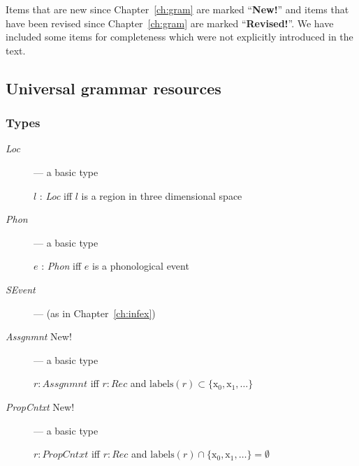 Items that are new since Chapter~\ref{ch:gram} are marked
``\textbf{New!}'' and items that have been revised since
Chapter~\ref{ch:gram} are marked ``\textbf{Revised!}''.  We have
included some items for completeness which were not explicitly
introduced in the text.

\subsection{Universal grammar resources} 

\subsubsection{Types} 

\begin{description}

  \item[\textnormal{\textit{Loc}}] --- a basic type

  $l$ : \textit{Loc} iff $l$ is a region in three dimensional space

  
\item[\textnormal{\textit{Phon}}] --- a basic type

  $e$ : \textit{Phon} iff $e$ is a phonological event
  
\item[\textnormal{\textit{SEvent}}] ---  (as in
      Chapter~\ref{ch:infex})

      
    \item[\textnormal{\textit{Assgnmnt}} New!] --- a basic type

      $r:\textit{Assgnmnt}$ iff
$r:\textit{Rec}$ and
$\mathrm{labels}(r)\subset\{\text{x}_0,\text{x}_1,\ldots\}$

\item[\textnormal{\textit{PropCntxt}} New!] --- a basic type

  $r:\textit{PropCntxt}$ iff
$r:\textit{Rec}$ and
$\mathrm{labels}(r)\cap\{\text{x}_0,\text{x}_1,\ldots\}=\emptyset$


\end{description}
